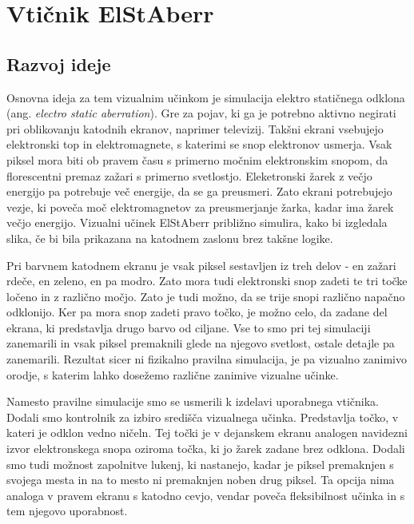 \documentclass[a4paper, 12pt]{book}
\begin{document}
\section{Vtičnik ElStAberr}

\subsection{Razvoj ideje}

Osnovna ideja za tem vizualnim učinkom je simulacija elektro statičnega odklona (ang. {\it electro static aberration})\cite{elstaberr}.
Gre za pojav, ki ga je potrebno aktivno negirati pri oblikovanju katodnih ekranov, naprimer televizij.
Takšni ekrani vsebujejo elektronski top in elektromagnete, s katerimi se snop elektronov usmerja.
Vsak piksel mora biti ob pravem času  s primerno močnim elektronskim snopom, da florescentni premaz zažari s primerno svetlostjo.
Eleketronski žarek z večjo energijo pa potrebuje več energije, da se ga preusmeri.
Zato ekrani potrebujejo vezje, ki poveča moč elektromagnetov za preusmerjanje žarka, kadar ima žarek večjo energijo.
Vizualni učinek ElStAberr približno simulira, kako bi izgledala slika, če bi bila prikazana na katodnem zaslonu brez takšne logike.

Pri barvnem katodnem ekranu je vsak piksel sestavljen iz treh delov - en zažari rdeče, en zeleno, en pa modro. 
Zato mora tudi elektronski snop zadeti te tri točke ločeno in z različno močjo.
Zato je tudi možno, da se trije snopi različno napačno odklonijo.
Ker pa mora snop zadeti pravo točko, je možno celo, da zadane del ekrana, ki predstavlja drugo barvo od ciljane.
Vse to smo pri tej simulaciji zanemarili in vsak piksel premaknili glede na njegovo svetlost, ostale detajle pa zanemarili.
Rezultat sicer ni fizikalno pravilna simulacija, je pa vizualno zanimivo orodje, s katerim lahko dosežemo različne zanimive vizualne učinke.

Namesto pravilne simulacije smo se usmerili k izdelavi uporabnega vtičnika.
Dodali smo kontrolnik za izbiro središča vizualnega učinka.
Predstavlja točko, v kateri je odklon vedno ničeln.
Tej točki je v dejanskem ekranu analogen navidezni izvor elektronskega snopa oziroma točka, ki jo žarek zadane brez odklona.
Dodali smo tudi možnost zapolnitve lukenj, ki nastanejo, kadar je piksel premaknjen s svojega mesta in na to mesto ni premaknjen noben drug piksel.
Ta opcija nima analoga v pravem ekranu s katodno cevjo, vendar poveča fleksibilnost učinka in s tem njegovo uporabnost.
\end{document}

